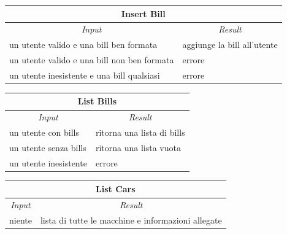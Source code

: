 \documentclass[english]{article}
\begin{document}
\begin{center}

	\begin{tabular}{ | p{6cm} | p{6cm} | }
		\hline 


		\hline

		\multicolumn{2}{|c|}{\textbf{Insert Bill}} \\
		\hline
		\multicolumn{1}{|c|}{\textit{Input}} & \multicolumn{1}{c|}{\textit{Result}} \\
		\hline
		un utente valido e una bill ben formata & aggiunge la bill all'utente \\
		\hline
		un utente valido e una bill non ben formata & errore \\
		\hline
		un utente inesistente e una bill qualsiasi & errore \\
		\hline
	\end{tabular}
\end{center}

\begin{center}

	\begin{tabular}{ | p{6cm} | p{6cm} | }
		\hline 


		\hline

		\multicolumn{2}{|c|}{\textbf{List Bills}} \\
		\hline
		\multicolumn{1}{|c|}{\textit{Input}} & \multicolumn{1}{c|}{\textit{Result}} \\
		\hline
		un utente con bills & ritorna una lista di bills \\
		\hline
		un utente senza bills & ritorna una lista vuota \\
		\hline
		un utente inesistente & errore \\
		\hline
	\end{tabular}
\end{center}

\begin{center}

	\begin{tabular}{ | p{6cm} | p{6cm} | }
		\hline 


		\hline

		\multicolumn{2}{|c|}{\textbf{List Cars}} \\
		\hline
		\multicolumn{1}{|c|}{\textit{Input}} & \multicolumn{1}{c|}{\textit{Result}} \\
		\hline
		niente & lista di tutte le macchine e informazioni allegate \\
		\hline
	\end{tabular}
\end{center}
\end{document}
